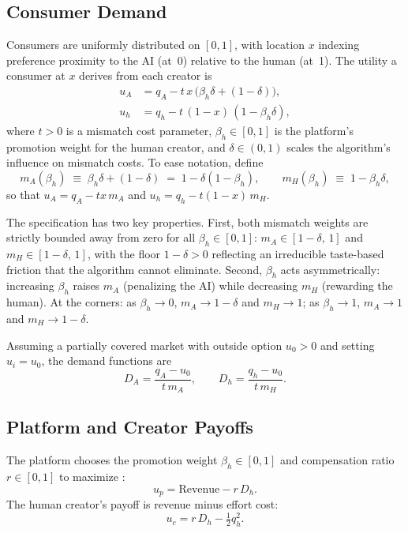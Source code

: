 \documentclass[mnsc,nonblindrev]{informs3_NoOR}
\begin{document}
\subsection{Consumer Demand}

Consumers are uniformly distributed on $[0,1]$, with location $x$ indexing preference proximity to the AI (at~0) relative to the human (at~1). The utility a consumer at $x$ derives from each creator is
\begin{align}
    u_A &= q_A - t\,x\,\bigl(\beta_h\delta + (1-\delta)\bigr), \label{eq:uA}\\
    u_h &= q_h - t\,(1-x)\,(1-\beta_h\delta), \label{eq:uh}
\end{align}
where $t > 0$ is a mismatch cost parameter, $\beta_h \in [0,1]$ is the platform's promotion weight for the human creator, and $\delta \in (0,1)$ scales the algorithm's influence on mismatch costs. To ease notation, define
\begin{equation}
    m_A(\beta_h) \;\equiv\; \beta_h\delta + (1-\delta) \;=\; 1 - \delta(1-\beta_h), \qquad
    m_H(\beta_h) \;\equiv\; 1 - \beta_h\delta,
    \label{eq:mismatch}
\end{equation}
so that $u_A = q_A - tx\,m_A$ and $u_h = q_h - t(1-x)\,m_H$.

The specification has two key properties. First, both mismatch weights are strictly bounded away from zero for all $\beta_h \in [0,1]$: $m_A \in [1-\delta,\, 1]$ and $m_H \in [1-\delta,\, 1]$, with the floor $1-\delta > 0$ reflecting an irreducible taste-based friction that the algorithm cannot eliminate. Second, $\beta_h$ acts asymmetrically: increasing $\beta_h$ raises $m_A$ (penalizing the AI) while decreasing $m_H$ (rewarding the human). At the corners: as $\beta_h \to 0$, $m_A \to 1-\delta$ and $m_H \to 1$; as $\beta_h \to 1$, $m_A \to 1$ and $m_H \to 1-\delta$.

Assuming a partially covered market with outside option $u_0 > 0$ and setting $u_i = u_0$, the demand functions are
\begin{equation}
    D_A = \frac{q_A - u_0}{t\,m_A}, \qquad
    D_h = \frac{q_h - u_0}{t\,m_H}.
    \label{eq:demands}
\end{equation}

\subsection{Platform and Creator Payoffs}

The platform chooses the promotion weight $\beta_h \in [0,1]$ and compensation ratio $r \in [0,1]$ to maximize :
\begin{equation}
    u_p = \text{Revenue} - r\,D_h.
    \label{eq:up}
\end{equation}
The human creator's payoff is revenue minus effort cost:
\begin{equation}
    u_c = r\,D_h - \tfrac{1}{2}q_h^2.
    \label{eq:uc}
\end{equation}
\end{document}
